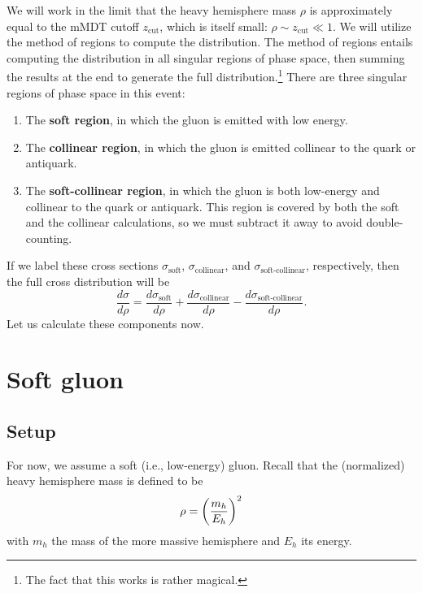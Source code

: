 \documentclass[../thesis.tex]{subfiles}
\providecommand{\zcut}{z_\mathrm{{cut}}}
\begin{document}
	We will work in the limit that the heavy hemisphere mass $\rho$ is approximately equal to the mMDT cutoff $\zcut$, which is itself small: $\rho \sim \zcut \ll 1$. We will utilize the method of regions \cite{becher_introduction_2015-1} to compute the distribution. The method of regions entails computing the distribution in all singular regions of phase space, then summing the results at the end to generate the full distribution.\footnote{The fact that this works is rather magical.} There are three singular regions of phase space in this event:
	\begin{enumerate}
		\item The \textbf{soft region}, in which the gluon is emitted with low energy.

		\item The \textbf{collinear region}, in which the gluon is emitted collinear to the quark or antiquark.

		\item The \textbf{soft-collinear region}, in which the gluon is both low-energy and collinear to the quark or antiquark. This region is covered by both the soft and the collinear calculations, so we must subtract it away to avoid double-counting.
	\end{enumerate}
	If we label these cross sections $\sigma_\text{soft}$, $\sigma_\text{collinear}$, and $\sigma_\text{soft-collinear}$, respectively, then the full cross distribution will be
	\begin{equation}
		\frac{d\sigma}{d\rho} = \frac{d\sigma_\text{soft}}{d\rho} + \frac{d\sigma_\text{collinear}}{d\rho} - \frac{d\sigma_\text{soft-collinear}}{d\rho}.
	\end{equation}
	Let us calculate these components now.

\section{Soft gluon}
\subsection{Setup}
	For now, we assume a soft (i.e., low-energy) gluon. Recall that the (normalized) heavy hemisphere mass is defined to be
	\begin{equation}
		\rho = \qty(\frac{m_h}{E_h})^2
	\end{equation}
	with $m_h$ the mass of the more massive hemisphere and $E_h$ its energy.
\end{document}
